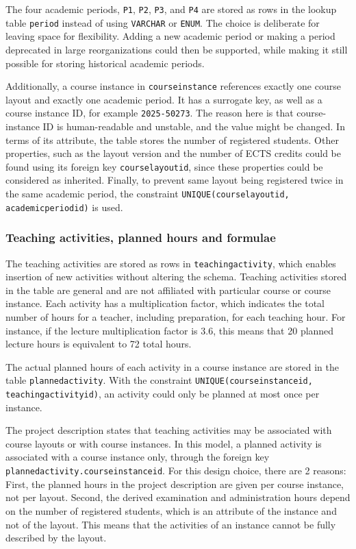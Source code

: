 \documentclass[a4paper]{scrartcl}
\renewcommand{\_}{\textunderscore\allowbreak}
\begin{document}
The four academic periods, \texttt{P1}, \texttt{P2}, \texttt{P3}, and \texttt{P4} are stored as rows in the lookup table \texttt{period} instead of using \texttt{VARCHAR} or \texttt{ENUM}. The choice is deliberate for leaving space for flexibility. Adding a new academic period or making a period deprecated in large reorganizations could then be supported, while making it still possible for storing historical academic periods.

Additionally, a course instance in \texttt{course\_instance} references exactly one course layout and exactly one academic period. It has a surrogate key, as well as a course instance ID, for example \texttt{2025-50273}. The reason here is that course-instance ID is human-readable and unstable, and the value might be changed. In terms of its attribute, the table stores the number of registered students. Other properties, such as the layout version and the number of ECTS credits could be found using its foreign key \texttt{course\_layout\_id}, since these properties could be considered as inherited. Finally, to prevent same layout being registered twice in the same academic period, the constraint \texttt{UNIQUE(course\_layout\_id, academic\_period\_id)} is used.

\subsubsection{Teaching activities, planned hours and formulae}

The teaching activities are stored as rows in \texttt{teaching\_activity}, which enables insertion of new activities without altering the schema. Teaching activities stored in the table are general and are not affiliated with particular course or course instance. Each activity has a multiplication factor, which indicates the total number of hours for a teacher, including preparation, for each teaching hour. For instance, if the lecture multiplication factor is 3.6, this means that 20 planned lecture hours is equivalent to 72 total hours.

The actual planned hours of each activity in a course instance are stored in the table \texttt{planned\_activity}. With the constraint \texttt{UNIQUE(course\_instance\_id, teaching\_activity\_id)}, an activity could only be planned at most once per instance.

The project description states that teaching activities may be associated with course layouts or with course instances. In this model, a planned activity is associated with a course instance only, through the foreign key \texttt{planned\_activity.course\_instance\_id}. For this design choice, there are 2 reasons: First, the planned hours in the project description are given per course instance, not per layout. Second, the derived examination and administration hours depend on the number of registered students, which is an attribute of the instance and not of the layout. This means that the activities of an instance cannot be fully described by the layout.
\end{document}
